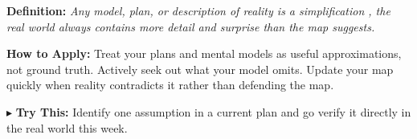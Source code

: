 \begin{tcolorbox}[title={\small \textbf{06 | The Map is Not the Territory}},
  colback=blue!5!white, colframe=blue!40!black,
  fonttitle=\bfseries\small, boxrule=0.5pt]
\textbf{Definition:} \textit{Any model, plan, or description of reality is a simplification , the real world always contains more detail and surprise than the map suggests.}

\medskip
\textbf{How to Apply:} Treat your plans and mental models as useful approximations, not ground truth. Actively seek out what your model omits. Update your map quickly when reality contradicts it rather than defending the map.

\medskip
$\blacktriangleright$ \textbf{Try This:} Identify one assumption in a current plan and go verify it directly in the real world this week.
\end{tcolorbox}

